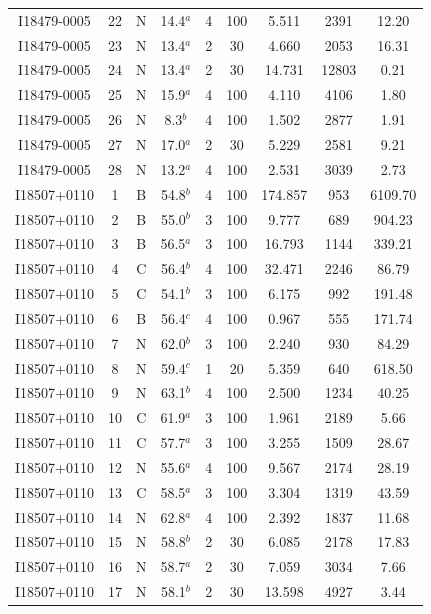 \begin{table}
\begin{tabular}{ccccccccc}
I18479-0005 & 22 & N & 14.4$^{a}$ & 4 & 100 & 5.511 & 2391 & 12.20 \\
I18479-0005 & 23 & N & 13.4$^{a}$ & 2 & 30 & 4.660 & 2053 & 16.31 \\
I18479-0005 & 24 & N & 13.4$^{a}$ & 2 & 30 & 14.731 & 12803 & 0.21 \\
I18479-0005 & 25 & N & 15.9$^{a}$ & 4 & 100 & 4.110 & 4106 & 1.80 \\
I18479-0005 & 26 & N & 8.3$^{b}$ & 4 & 100 & 1.502 & 2877 & 1.91 \\
I18479-0005 & 27 & N & 17.0$^{a}$ & 2 & 30 & 5.229 & 2581 & 9.21 \\
I18479-0005 & 28 & N & 13.2$^{a}$ & 4 & 100 & 2.531 & 3039 & 2.73 \\
I18507+0110 & 1 & B & 54.8$^{b}$ & 4 & 100 & 174.857 & 953 & 6109.70 \\
I18507+0110 & 2 & B & 55.0$^{b}$ & 3 & 100 & 9.777 & 689 & 904.23 \\
I18507+0110 & 3 & B & 56.5$^{a}$ & 3 & 100 & 16.793 & 1144 & 339.21 \\
I18507+0110 & 4 & C & 56.4$^{b}$ & 4 & 100 & 32.471 & 2246 & 86.79 \\
I18507+0110 & 5 & C & 54.1$^{b}$ & 3 & 100 & 6.175 & 992 & 191.48 \\
I18507+0110 & 6 & B & 56.4$^{c}$ & 4 & 100 & 0.967 & 555 & 171.74 \\
I18507+0110 & 7 & N & 62.0$^{b}$ & 3 & 100 & 2.240 & 930 & 84.29 \\
I18507+0110 & 8 & N & 59.4$^{c}$ & 1 & 20 & 5.359 & 640 & 618.50 \\
I18507+0110 & 9 & N & 63.1$^{b}$ & 4 & 100 & 2.500 & 1234 & 40.25 \\
I18507+0110 & 10 & C & 61.9$^{a}$ & 3 & 100 & 1.961 & 2189 & 5.66 \\
I18507+0110 & 11 & C & 57.7$^{a}$ & 3 & 100 & 3.255 & 1509 & 28.67 \\
I18507+0110 & 12 & N & 55.6$^{a}$ & 4 & 100 & 9.567 & 2174 & 28.19 \\
I18507+0110 & 13 & C & 58.5$^{a}$ & 3 & 100 & 3.304 & 1319 & 43.59 \\
I18507+0110 & 14 & N & 62.8$^{a}$ & 4 & 100 & 2.392 & 1837 & 11.68 \\
I18507+0110 & 15 & N & 58.8$^{b}$ & 2 & 30 & 6.085 & 2178 & 17.83 \\
I18507+0110 & 16 & N & 58.7$^{a}$ & 2 & 30 & 7.059 & 3034 & 7.66 \\
I18507+0110 & 17 & N & 58.1$^{b}$ & 2 & 30 & 13.598 & 4927 & 3.44 \\

\end{tabular}
\end{table}
